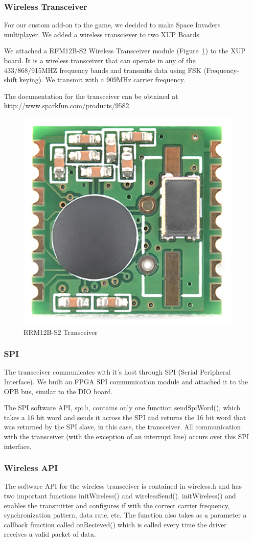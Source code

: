\documentclass[11pt,letter,oneside]{report}
\begin{document}
\subsubsection{Wireless Transceiver}

For our custom add-on to the game, we decided to make Space Invaders multiplayer.  We added a wireless transciever to two XUP Boards 

We attached a RFM12B-S2 Wireless Transceiver module (Figure~\ref{fig:wireless}) to the XUP board.  It is a wireless transceiver that can operate in any of the 433/868/915MHZ frequency bands and transmits data using FSK (Frequency-shift keying).  We transmit with a 909MHz carrier frequency.  

The documentation for the transceiver can be obtained at http://www.sparkfun.com/products/9582.   

\begin{figure}
\centering
\includegraphics[width=.5\textwidth]{tranciever.jpg}
\caption{RRM12B-S2 Transceiver}
\label{fig:wireless}
\end{figure}

\subsubsection{SPI}
The transceiver communicates with it's host through SPI (Serial Peripheral Interface).  We built an FPGA SPI communication module and attached it to the OPB bus, similar to the DIO board.  

The SPI software API, spi.h, contains only one function sendSpiWord(), which takes a 16 bit word and sends it across the SPI and returns the 16 bit word that was returned by the SPI slave, in this case, the transceiver.  All communication with the transceiver (with the exception of an interrupt line) occurs over this SPI interface.  

\subsubsection{Wireless API}
The software API for the wireless transceiver is contained in wireless.h and has two important functions initWireless() and wirelessSend().  initWireless() and enables the transmitter and configures if with the correct carrier frequency, synchronization pattern, data rate, etc.  The function also takes as a parameter a callback function called onRecieved() which is called every time the driver receives a valid packet of data.  
\end{document}
